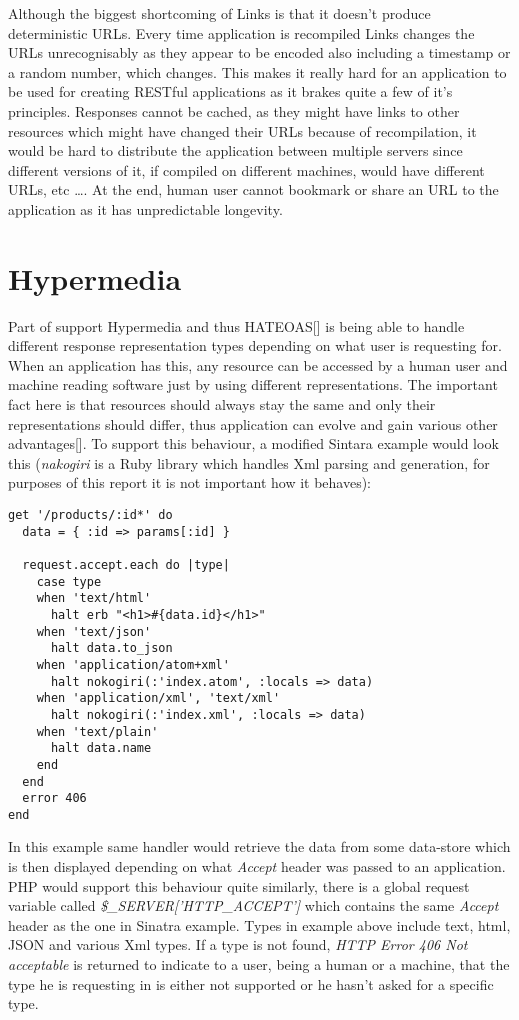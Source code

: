 Although the biggest shortcoming of Links is that it doesn't produce deterministic URLs. Every time application is recompiled Links changes the URLs unrecognisably as they appear to be encoded also including a timestamp or a random number, which changes. This makes it really hard for an application to be used for creating RESTful applications as it brakes quite a few of it's principles. Responses cannot be cached, as they might have links to other resources which might have changed their URLs because of recompilation, it would be hard to distribute the application between multiple servers since different versions of it, if compiled on different machines, would have different URLs, etc \ldots. At the end, human user cannot bookmark or share an URL to the application as it has unpredictable longevity. 

\section{Hypermedia}

Part of support Hypermedia and thus HATEOAS[] is being able to handle different response representation types depending on what user is requesting for. When an application has this, any resource can be accessed by a human user and machine reading software just by using different representations. The important fact here is that resources should always stay the same and only their representations should differ, thus application can evolve and gain various other advantages[]. To support this behaviour, a modified Sintara example would look this (\textit{nakogiri} is a Ruby library which handles Xml parsing and generation, for purposes of this report it is not important how it behaves):

\begin{codelisting}
\begin{verbatim}
get '/products/:id*' do
  data = { :id => params[:id] }

  request.accept.each do |type|
    case type
    when 'text/html'
      halt erb "<h1>#{data.id}</h1>"
    when 'text/json'
      halt data.to_json
    when 'application/atom+xml'
      halt nokogiri(:'index.atom', :locals => data)
    when 'application/xml', 'text/xml'
      halt nokogiri(:'index.xml', :locals => data)
    when 'text/plain'
      halt data.name
    end
  end
  error 406
end
\end{verbatim}
\end{codelisting}

In this example same handler would retrieve the data from some data-store which is then displayed depending on what \textit{Accept} header was passed to an application. PHP would support this behaviour quite similarly, there is a global request variable called \textit{\$\_SERVER['HTTP\_ACCEPT']} which contains the same \textit{Accept} header as the one in Sinatra example. Types in example above include text, html, JSON and various Xml types. If a type is not found, \textit{HTTP Error 406 Not acceptable} is returned to indicate to a user, being a human or a machine, that the type he is requesting in is either not supported or he hasn't asked for a specific type. 

